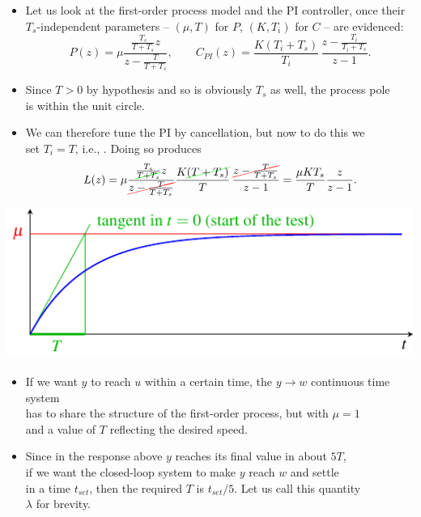 \begin{frame}
\myPause
 \begin{itemize}[<+-| alert@+>]
 \item Let us look at the first-order process model and the PI controller, once their\\
       $T_s$-independent parameters -- $(\mu,T)$ for $P$, $(K,T_i)$ for $C$ -- are evidenced:
       \begin{displaymath}
        P(z)      = \mu \frac{\frac{T_s}{T+T_s} z}{z-\frac{T}{T+T_s}}, \qquad
        C_{PI}(z) = \frac{K(T_i+T_s)}{T_i} \, \frac{z-\frac{T_i}{T_i+T_s}}{z-1}.
       \end{displaymath}
 \item Since $T>0$ by hypothesis and so is obviously $T_s$ as well, the process pole\\
       is within the unit circle.
 \item We can therefore tune the PI by cancellation, but now to do this we\\
       set $T_i=T$, i.e., . Doing so produces 
       \begin{displaymath}
        L(z) = \mu \frac{\frac{T_s}{\ccancel[green]{T+T_s}} z}{\ccancel[red]{z-\frac{T}{T+T_s}}}
               \frac{K\ccancel[green]{(T+T_s)}}{T} \, \frac{\ccancel[red]{z-\frac{T}{T+T_s}}}{z-1}
             = \frac{\mu K T_s}{T} \frac{z}{z-1}.
       \end{displaymath}
 \end{itemize}
\end{frame}

\begin{frame}
\framesubtitleTC{}
\myPause
 \begin{center}
  \includegraphics[width=0.45\columnwidth]{./Unit-06/img/FOstepResponse.pdf}
 \end{center}
 \begin{itemize}[<+-| alert@+>]
 \item If we want $y$ to reach $u$ within a certain time, the $y \rightarrow w$ continuous time system\\
       has to share the structure of the first-order process, but with $\mu=1$\\
       and a value of $T$ reflecting the desired speed.
 \item Since in the response above $y$ reaches its final value in about $5T$,\\
       if we want the closed-loop system to make $y$ reach $w$ and settle\\
       in a time $t_{set}$, then the required $T$ is $t_{set}/5$. Let us call this quantity\\
       $\lambda$ for brevity.
 \end{itemize}
\end{frame}

